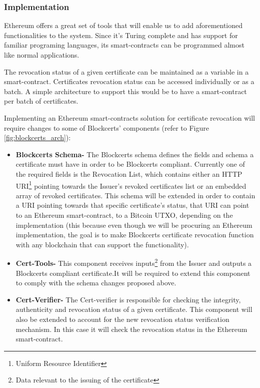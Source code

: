 \documentclass[llncsdoc]{llncs}
\begin{document}
\subsubsection{Implementation}
Ethereum offers a great set of tools that will enable us to add aforementioned functionalities to the system. Since it's Turing complete and has support for familiar programing languages, its smart-contracts can be programmed almost like normal applications.

The revocation status of a given certificate can be maintained as a variable in a smart-contract. Certificates revocation status can be accessed individually or as a batch. A simple architecture to support this would be to have a smart-contract per batch of certificates. 

Implementing an Ethereum smart-contracts solution for certificate revocation will require changes to some of Blockcerts' components (refer to Figure \ref{fig:blockcerts_arch}):
\begin{itemize}
    \item \textbf{Blockcerts Schema-} The Blockcerts schema defines the fields and schema a certificate must have in order to be Blockcerts compliant. Currently one of the required fields is the Revocation List, which contains either an HTTP URI\footnote{Uniform Resource Identifier} pointing towards the Issuer's revoked certificates list or an embedded array of revoked certificates. This schema will be extended in order to contain a URI pointing towards that specific certificate's status, that URI can point to an Ethereum smart-contract, to a Bitcoin UTXO, depending on the implementation (this because even though we will be procuring an Ethereum implementation, the goal is to make Blockcerts certificate revocation function with any blockchain that can support the functionality).
    
    \item \textbf{Cert-Tools-} This component receives inputs\footnote{Data relevant to the issuing of the certificate} from the Issuer and outputs a Blockcerts compliant certificate.It will be required to extend this component to comply with the schema changes proposed above.
    \item \textbf{Cert-Verifier-} The Cert-verifier is responsible for checking the integrity, authenticity and revocation status of a given certificate. This component will also be extended to account for the new revocation status verification mechanism. In this case it will check the revocation status in the Ethereum smart-contract.
\end{itemize}
\end{document}
